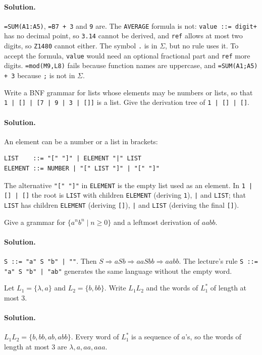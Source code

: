 \paragraph{Solution.} \texttt{=SUM(A1:A5)}, \texttt{=B7 + 3} and \texttt{9} are.
The \texttt{AVERAGE} formula is not: \texttt{value ::= digit+} has no decimal
point, so \texttt{3.14} cannot be derived, and \texttt{ref} allows at most two
digits, so \texttt{Z1480} cannot either. The symbol \texttt{.} is in $\Sigma$,
but no rule uses it. To accept the formula, \texttt{value} would need an
optional fractional part and \texttt{ref} more digits. \texttt{=mod(M9,L8)}
fails because function names are uppercase, and \texttt{=SUM(A1;A5) + 3}
because \texttt{;} is not in $\Sigma$.

\begin{exercise}
Write a BNF grammar for lists whose elements may be numbers or lists, so that
\texttt{1 | [] | [7 | 9 | 3 | []]} is a list. Give the derivation tree of
\texttt{1 | [] | []}.
\end{exercise}

\paragraph{Solution.} An element can be a number or a list in brackets:
\begin{lstlisting}
LIST    ::= "[" "]" | ELEMENT "|" LIST
ELEMENT ::= NUMBER | "[" LIST "]" | "[" "]"
\end{lstlisting}
The alternative \lstinline{"[" "]"} in \texttt{ELEMENT} is the empty list used as
an element. In \texttt{1 | [] | []} the root is \texttt{LIST} with children
\texttt{ELEMENT} (deriving \texttt{1}), \texttt{|} and \texttt{LIST}; that
\texttt{LIST} has children \texttt{ELEMENT} (deriving \texttt{[]}), \texttt{|} and
\texttt{LIST} (deriving the final \texttt{[]}).

\begin{exercise}
Give a grammar for $\{a^n b^n \mid n \ge 0\}$ and a leftmost derivation of
$aabb$.
\end{exercise}

\paragraph{Solution.} \lstinline{S ::= "a" S "b" | ""}. Then
$S \Rightarrow aSb \Rightarrow aaSbb \Rightarrow aabb$. The lecture's rule
\lstinline{S ::= "a" S "b" | "ab"} generates the same language without the
empty word.

\begin{exercise}
Let $L_1 = \{\lambda, a\}$ and $L_2 = \{b, bb\}$. Write $L_1 L_2$ and the
words of $L_1^*$ of length at most 3.
\end{exercise}

\paragraph{Solution.} $L_1 L_2 = \{b, bb, ab, abb\}$. Every word of $L_1^*$ is
a sequence of $a$'s, so the words of length at most 3 are $\lambda, a, aa, aaa$.
